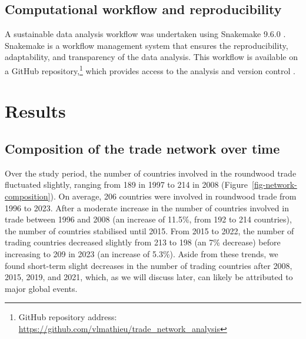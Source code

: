 \documentclass[
  authoryear,
  review,
  3p]{elsarticle}
\begin{document}
\subsection{Computational workflow and
reproducibility}\label{computational-workflow-and-reproducibility}

A sustainable data analysis workflow was undertaken using Snakemake
9.6.0 \citep{molder_sustainable_2025}. Snakemake is a workflow
management system that ensures the reproducibility, adaptability, and
transparency of the data analysis. This workflow is available on a
GitHub repository,\footnote{GitHub repository address:
  \url{https://github.com/vlmathieu/trade_network_analysis}} which
provides access to the analysis and version control
\citep{braga_not_2023}.

\section{Results}\label{results}

\subsection{Composition of the trade network over
time}\label{composition-of-the-trade-network-over-time}

Over the study period, the number of countries involved in the roundwood
trade fluctuated slightly, ranging from 189 in 1997 to 214 in 2008
(Figure~\ref{fig-network-composition}). On average, 206 countries were
involved in roundwood trade from 1996 to 2023. After a moderate increase
in the number of countries involved in trade between 1996 and 2008 (an
increase of 11.5\%, from 192 to 214 countries), the number of countries
stabilised until 2015. From 2015 to 2022, the number of trading
countries decreased slightly from 213 to 198 (an 7\% decrease) before
increasing to 209 in 2023 (an increase of 5.3\%). Aside from these
trends, we found short-term slight decreases in the number of trading
countries after 2008, 2015, 2019, and 2021, which, as we will discuss
later, can likely be attributed to major global events.
\end{document}
